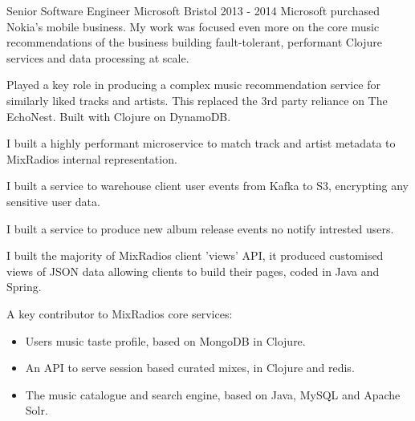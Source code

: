 \begin{cventries}
  \cventrypara
    {Senior Software Engineer} %
    {Microsoft} %
    {Bristol} %
    {2013  - 2014} %
    {Microsoft purchased Nokia's mobile business. My work was focused even more on the core music recommendations of the business building fault-tolerant, performant Clojure services and data processing at scale.}
    {
      \begin{cvitems} %
        \item {Played a key role in producing a complex music recommendation service for similarly liked tracks and artists. This replaced the 3rd party reliance on The EchoNest. Built with Clojure on DynamoDB.}
        \item {I built a highly performant microservice to match track and artist metadata to MixRadios internal representation.}
        \item {I built a service to warehouse client user events from Kafka to S3, encrypting any sensitive user data.}
        \item {I built a service to produce new album release events no notify intrested users.}
        \item {I built the majority of MixRadios client ’views’ API, it produced customised views of JSON data allowing clients to build their pages, coded in Java and Spring.}
        \item {A key contributor to MixRadios core services:
            \begin{itemize}
                \item Users music taste profile, based on MongoDB in Clojure.
                \item An API to serve session based curated mixes, in Clojure and redis.
                \item The music catalogue and search engine, based on Java, MySQL and Apache Solr.
            \end{itemize}}
      \end{cvitems}
    }


\end{cventries}

